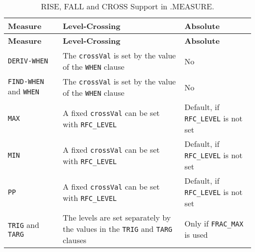 


\begin{longtable}[h] {>{\raggedright\small}m{1.0in}|>{\raggedright\let\\\tabularnewline\small}m{2.5in}
  |>{\raggedright\let\\\tabularnewline\small}m{2.5in}}
  \caption{RISE, FALL and CROSS Support in .MEASURE.} \\ \hline
  \rowcolor{XyceDarkBlue}
  \color{white}\bf Measure &
  \color{white}\bf Level-Crossing &
  \color{white}\bf Absolute \\ \hline \endfirsthead
  \rowcolor{XyceDarkBlue}
  \color{white}\bf Measure &
  \color{white}\bf Level-Crossing &
  \color{white}\bf Absolute \\ \hline \endhead
  \label{RISE_FALL_CROSS}

  \texttt{DERIV-WHEN} & The  \texttt{crossVal} is set by the value of the
                 \texttt{WHEN} clause & No \\ \hline
  \texttt{FIND-WHEN} and \texttt{WHEN} & The  \texttt{crossVal} is set by the
         value of the \texttt{WHEN} clause & No \\ \hline
  \texttt{MAX} & A fixed \texttt{crossVal} can be set with \texttt{RFC\_LEVEL} 
               & Default, if \texttt{RFC\_LEVEL} is not set \\ \hline
  \texttt{MIN} & A fixed \texttt{crossVal} can be set with \texttt{RFC\_LEVEL} 
               & Default, if \texttt{RFC\_LEVEL} is not set \\ \hline
  \texttt{PP} & A fixed \texttt{crossVal} can be set with \texttt{RFC\_LEVEL} 
              & Default, if \texttt{RFC\_LEVEL} is not set \\ \hline
  \texttt{TRIG} and \texttt{TARG} & The levels are set separately by the values 
                in the \texttt{TRIG} and \texttt{TARG} clauses & Only if 
                \texttt{FRAC\_MAX} is used\\ \hline
\end{longtable}

